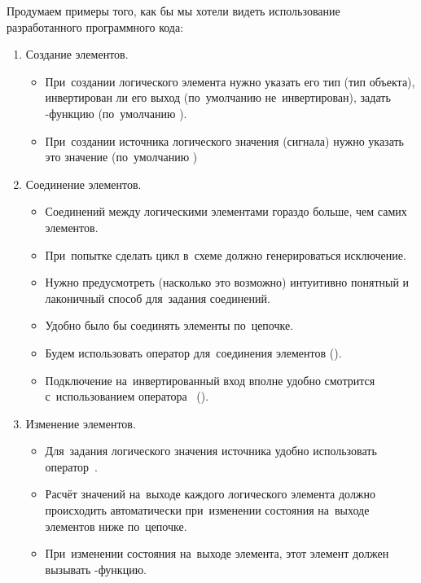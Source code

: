 \bigskip Продумаем примеры того, как бы мы хотели видеть использование разработанного программного кода:
\begin{enumerate}
    \item Создание элементов.
    \begin{itemize}
        \item При~создании логического элемента нужно указать его тип (тип объекта), инвертирован ли его выход (по~умолчанию не~инвертирован), задать -функцию (по~умолчанию ).
        \item При~создании источника логического значения (сигнала) нужно указать это значение (по~умолчанию )
    \end{itemize}

    \item Соединение элементов.
    \begin{itemize}
        \item Соединений между логическими элементами гораздо больше, чем самих элементов.
        \item При~попытке сделать цикл в~схеме должно генерироваться исключение.
        \item Нужно предусмотреть (насколько это возможно) интуитивно понятный и лаконичный способ для~задания соединений.
        \item Удобно было бы соединять элементы по~цепочке.
        \item Будем использовать оператор \code{>>} для~соединения элементов ().
        \item Подключение на~инвертированный вход вполне удобно смотрится с~использованием оператора~\code{\textasciitilde} ().
    \end{itemize}

    \item Изменение элементов.
    \begin{itemize}
        \item Для~задания логического значения источника удобно использовать оператор~\code{=}.
        \item Расчёт значений на~выходе каждого логического элемента должно происходить автоматически при~изменении состояния на~выходе элементов ниже по~цепочке.
        \item При~изменении состояния на~выходе элемента, этот элемент должен вызывать -функцию.
    \end{itemize}


\end{enumerate}
